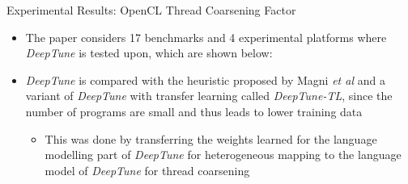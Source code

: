 \documentclass[10pt]{beamer}
\begin{document}
\begin{frame}{Experimental Results: OpenCL Thread Coarsening Factor}
\begin{itemize}
\item<1->{The paper considers 17 benchmarks and 4 experimental platforms where \emph{DeepTune} is tested upon, which are shown below:}
\end{itemize}
\begin{itemize}
\item<2->{\emph{DeepTune} is compared with the heuristic proposed by Magni \textit{et al} and a variant of \emph{DeepTune} with transfer learning called \emph{DeepTune-TL}, since the number of programs are small and thus leads to lower training data
         \begin{itemize}
         \item<3->{This was done by transferring the weights learned for the language modelling part of \emph{DeepTune} for heterogeneous mapping to the language model of \emph{DeepTune} for thread coarsening}
         \end{itemize}}
\end{itemize}
\end{frame}
\end{document}
